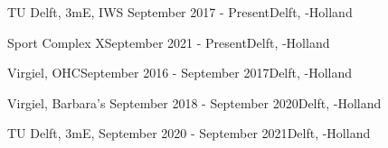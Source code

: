 \begin{rSection}{}
  \begin{experienceItem}
    {TU Delft, 3mE, IWS }{September 2017 - Present}{}{Delft, -Holland}
  \end{experienceItem}

  \begin{experienceItem}
    {Sport Complex X}{September 2021 - Present}{}{Delft, -Holland}
  \end{experienceItem}

\end{rSection}


\begin{rSection}{}
  \begin{experienceItem}{Virgiel, OHC}{September 2016 - September 2017}{}{Delft, -Holland}
  \end{experienceItem}

  \begin{experienceItem}{Virgiel, Barbara's }{September 2018 - September 2020}{}{Delft, -Holland}
  \end{experienceItem}

  \begin{experienceItem}
    {TU Delft, 3mE, }{September 2020 - September 2021}{}{Delft, -Holland}
  \end{experienceItem}

\end{rSection}



